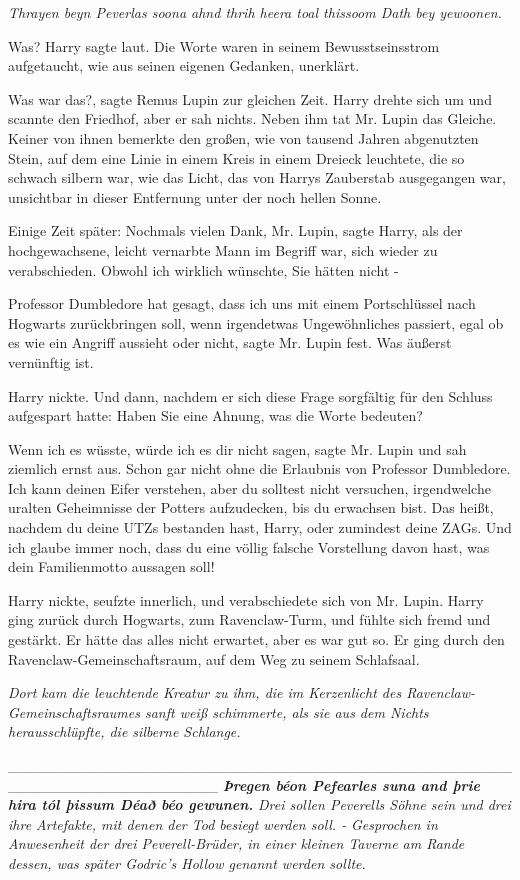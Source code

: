 \emph{Thrayen beyn Peverlas soona ahnd
thrih heera toal thissoom Dath bey yewoonen.}

\glqq{}Was?\grqq{} Harry sagte laut. Die Worte waren in seinem Bewusstseinsstrom
aufgetaucht, wie aus seinen eigenen Gedanken, unerklärt.

\glqq{}Was war das?\grqq{}, sagte Remus Lupin zur gleichen Zeit. Harry drehte
sich um und scannte den Friedhof, aber er sah nichts. Neben ihm tat Mr. Lupin
das Gleiche. Keiner von ihnen bemerkte den großen, wie von tausend Jahren
abgenutzten Stein, auf dem eine Linie in einem Kreis in einem Dreieck leuchtete,
die so schwach silbern war, wie das Licht, das von Harrys Zauberstab ausgegangen
war, unsichtbar in dieser Entfernung unter der noch hellen Sonne.

Einige Zeit später: \glqq{}Nochmals vielen Dank, Mr. Lupin\grqq{}, sagte Harry,
als der hochgewachsene, leicht vernarbte Mann im Begriff war, sich wieder zu
verabschieden. \glqq{}Obwohl ich wirklich wünschte, Sie hätten nicht -\grqq{}

\glqq{}Professor Dumbledore hat gesagt, dass ich uns mit einem Portschlüssel nach
Hogwarts zurückbringen soll, wenn irgendetwas Ungewöhnliches passiert, egal ob
es wie ein Angriff aussieht oder nicht\grqq{}, sagte Mr. Lupin fest. \glqq{}Was
äußerst vernünftig ist.\grqq{}

Harry nickte. Und dann, nachdem er sich diese Frage sorgfältig für den Schluss
aufgespart hatte: \glqq{}Haben Sie eine Ahnung, was die Worte bedeuten?\grqq{}

\glqq{}Wenn ich es wüsste, würde ich es dir nicht sagen\grqq{}, sagte Mr. Lupin
und sah ziemlich ernst aus. \glqq{}Schon gar nicht ohne die Erlaubnis von
Professor Dumbledore. Ich kann deinen Eifer verstehen, aber du solltest nicht
versuchen, irgendwelche uralten Geheimnisse der Potters aufzudecken, bis du
erwachsen bist. Das heißt, nachdem du deine UTZs bestanden hast, Harry, oder
zumindest deine ZAGs. Und ich glaube immer noch, dass du eine völlig falsche
Vorstellung davon hast, was dein Familienmotto aussagen soll!\grqq{}

Harry nickte, seufzte innerlich, und verabschiedete sich von Mr. Lupin. Harry
ging zurück durch Hogwarts, zum Ravenclaw-Turm, und fühlte sich fremd und
gestärkt. Er hätte das alles nicht erwartet, aber es war gut so. Er ging durch
den Ravenclaw-Gemeinschaftsraum, auf dem Weg zu seinem Schlafsaal.

\emph{Dort kam die leuchtende Kreatur zu ihm, die im Kerzenlicht des
Ravenclaw-Gemeinschaftsraumes sanft weiß schimmerte, als sie aus dem Nichts
herausschlüpfte, die silberne Schlange.}

____________________________________________________________________
\emph{\textbf{\emph{Þregen béon Pefearles suna and þrie hira tól þissum Déað béo
gewunen.}}} \textbf{\emph{} } \emph{Drei sollen Peverells Söhne sein und drei
ihre Artefakte, mit denen der Tod besiegt werden soll. -}   \emph{Gesprochen in
Anwesenheit der drei Peverell-Brüder, in einer kleinen Taverne am Rande dessen,
was später Godric's Hollow genannt werden sollte.}

